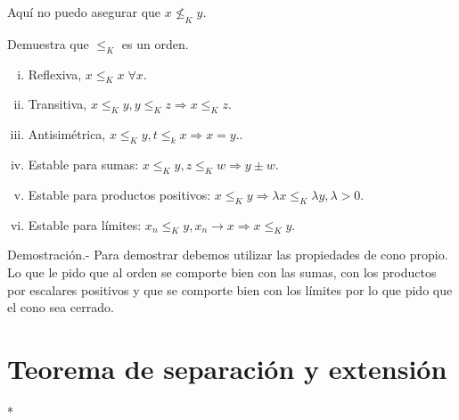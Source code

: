 \begin{paracol}{2}
\begin{center}
\end{center}

Aquí no puedo asegurar que $x\not\leq_K y.$

{\color{blue}
\begin{ejer}
    Demuestra que $\leq_K$ es un orden.
    \begin{enumerate}[i)]
	\item Reflexiva, $x\leq_K x \; \forall x.$
	\item Transitiva, $x\leq_K y, y\leq_K z \Rightarrow x \leq_K z$.
	\item Antisimétrica, $x\leq_Ky, t\leq_k x \Rightarrow x=y$..
	\item Estable para sumas: $x\leq_K y, z\leq_K w \Rightarrow y\pm w$.
	\item Estable para productos positivos: $x\leq_K y \Rightarrow \lambda x\leq_K \lambda y, \lambda >0$.
	\item Estable para límites: $x_n\leq_K y, x_n\to x \Rightarrow x\leq_K y$.
    \end{enumerate}
	    Demostración.-\; Para demostrar debemos utilizar las propiedades de cono propio. Lo que le pido que al orden se comporte bien con las sumas, con los productos por escalares positivos y que se comporte bien con los límites por lo que pido que el cono sea cerrado.
\end{ejer}
}

\section{Teorema de separación y extensión}
\switchcolumn[1]*{\noindent\scriptsize
\begin{center}
\end{center}

}
\end{paracol}
